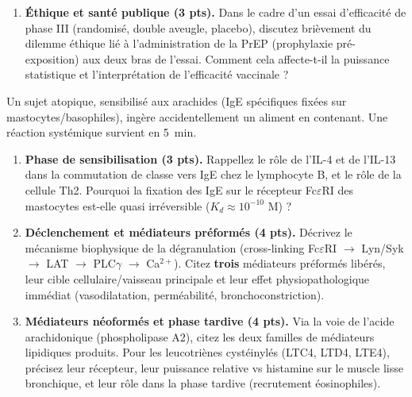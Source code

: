 \documentclass[11pt]{article}
\begin{document}
\begin{exercice}
\begin{enumerate}
    \item \textbf{Éthique et santé publique (3 pts).} Dans le cadre d'un essai d'efficacité de phase III (randomisé, double aveugle, placebo), discutez brièvement du dilemme éthique lié à l'administration de la PrEP (prophylaxie pré-exposition) aux deux bras de l'essai. Comment cela affecte-t-il la puissance statistique et l'interprétation de l'efficacité vaccinale ?
\end{enumerate}
\end{exercice}

\begin{exercice}
Un sujet atopique, sensibilisé aux arachides (IgE spécifiques fixées sur mastocytes/basophiles), ingère accidentellement un aliment en contenant. Une réaction systémique survient en \SI{5}{\minute}.

\begin{enumerate}
    \item \textbf{Phase de sensibilisation (3 pts).} Rappellez le rôle de l'IL-4 et de l'IL-13 dans la commutation de classe vers IgE chez le lymphocyte B, et le rôle de la cellule Th2. Pourquoi la fixation des IgE sur le récepteur Fc$\varepsilon$RI des mastocytes est-elle quasi irréversible ($K_d \approx 10^{-10}$ M) ?
    
    \item \textbf{Déclenchement et médiateurs préformés (4 pts).} Décrivez le mécanisme biophysique de la dégranulation (cross-linking Fc$\varepsilon$RI $\rightarrow$ Lyn/Syk $\rightarrow$ LAT $\rightarrow$ PLC$\gamma$ $\rightarrow$ Ca$^{2+}$). Citez \textbf{trois} médiateurs préformés libérés, leur cible cellulaire/vaisseau principale et leur effet physiopathologique immédiat (vasodilatation, perméabilité, bronchoconstriction).
    
    \item \textbf{Médiateurs néoformés et phase tardive (4 pts).} Via la voie de l'acide arachidonique (phospholipase A2), citez les deux familles de médiateurs lipidiques produits. Pour les leucotriènes cystéinylés (LTC4, LTD4, LTE4), précisez leur récepteur, leur puissance relative vs histamine sur le muscle lisse bronchique, et leur rôle dans la phase tardive (recrutement éosinophiles).
    

\end{enumerate}
\end{exercice}
\end{document}
